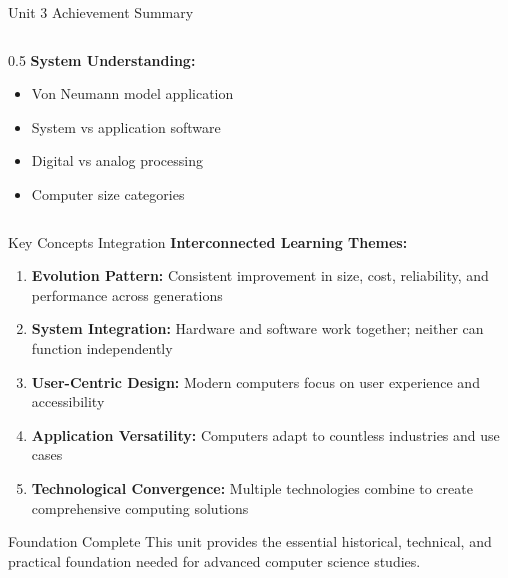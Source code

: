 \documentclass[aspectratio=169]{beamer}
\begin{document}
\begin{frame}{Unit 3 Achievement Summary}
\begin{columns}
\begin{column}{0.5\textwidth}
            \vspace{0.3cm}
            \textbf{System Understanding:}
            \begin{itemize}
                \item Von Neumann model application
                \item System vs application software
                \item Digital vs analog processing
                \item Computer size categories
            \end{itemize}
        \end{column}
    \end{columns}
\end{frame}

\begin{frame}{Key Concepts Integration}
    \textbf{Interconnected Learning Themes:}
    
    \begin{enumerate}
        \item \textbf{Evolution Pattern:} Consistent improvement in size, cost, reliability, and performance across generations
        
        \item \textbf{System Integration:} Hardware and software work together; neither can function independently
        
        \item \textbf{User-Centric Design:} Modern computers focus on user experience and accessibility
        
        \item \textbf{Application Versatility:} Computers adapt to countless industries and use cases
        
        \item \textbf{Technological Convergence:} Multiple technologies combine to create comprehensive computing solutions
    \end{enumerate}
    
    \vspace{0.5cm}
    \begin{alertblock}{Foundation Complete}
        This unit provides the essential historical, technical, and practical foundation needed for advanced computer science studies.
    \end{alertblock}
\end{frame}

 
\end{document}
